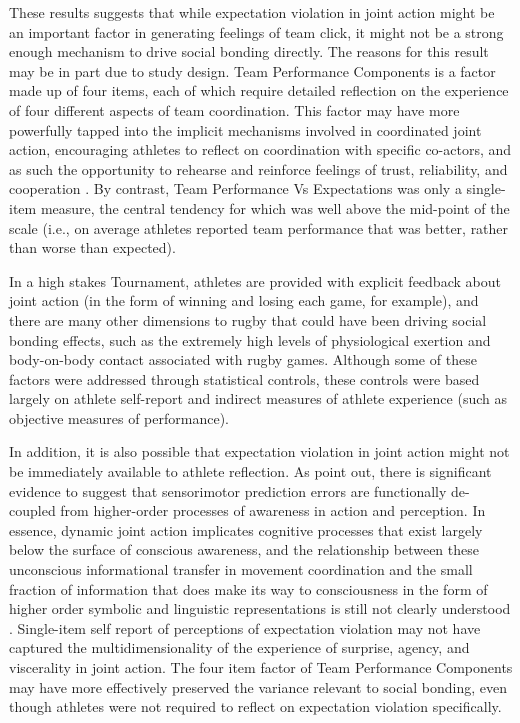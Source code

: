 \begin{CJK}{UTF8}{gbsn}
These results suggests that while expectation violation in joint action might be an important factor in generating feelings of team click, it might not be a strong enough mechanism to drive social bonding directly. The reasons for this result may be in part due to study design.  Team Performance Components is a factor made up of four items, each of which require detailed reflection on the experience of four different aspects of team coordination.  This factor may have more powerfully tapped into the implicit mechanisms involved in coordinated joint action, encouraging athletes to reflect on coordination with specific co-actors, and as such the opportunity to rehearse and reinforce feelings of trust, reliability, and cooperation \citep{Reddish2013a}. By contrast, Team Performance Vs Expectations was only a single-item measure, the central tendency for which was well above the mid-point of the scale (i.e., on average athletes reported team performance that was better, rather than worse than expected).

In a high stakes Tournament, athletes are provided with explicit feedback about joint action (in the form of winning and losing each game, for example), and there are many other dimensions to rugby that could have been driving social bonding effects, such as the extremely high levels of physiological exertion and body-on-body contact associated with rugby games.  Although some of these factors were addressed through statistical controls, these controls were based largely on athlete self-report and indirect measures of athlete experience (such as objective measures of performance).

In addition, it is also possible that expectation violation in joint action might not be immediately available to athlete reflection.  As \textcite{VanderWel2012} point out, there is significant evidence to suggest that sensorimotor prediction errors are functionally de-coupled from higher-order processes of awareness in action and perception. In essence, dynamic joint action implicates cognitive processes that exist largely below the surface of conscious awareness, and the relationship between these unconscious informational transfer in movement coordination and the small fraction of information that does make its way to consciousness in the form of higher order symbolic and linguistic representations is still not clearly understood \citep{Semin2008,Frith2007,Frith2010,Clark2013}.  Single-item self report of perceptions of expectation violation may not have captured the multidimensionality of the experience of surprise, agency, and viscerality in joint action.  The four item factor of Team Performance Components may have more effectively preserved the variance relevant to social bonding, even though athletes were not required to reflect on expectation violation specifically.


\end{CJK}

